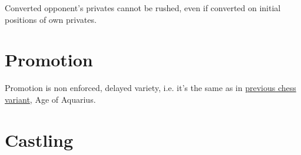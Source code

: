 Converted opponent's privates cannot be rushed, even if converted on initial
positions of own privates.

%
%
%
%

\clearpage %

\section*{Promotion}
\label{sec:Hemera's Dawn/Promotion}

Promotion is non enforced, delayed variety, i.e. it's the same as in
\hyperref[sec:Age of Aquarius/Promotion]{previous chess variant}, Age of Aquarius.


\section*{Castling}
\label{sec:Hemera's Dawn/Castling}

